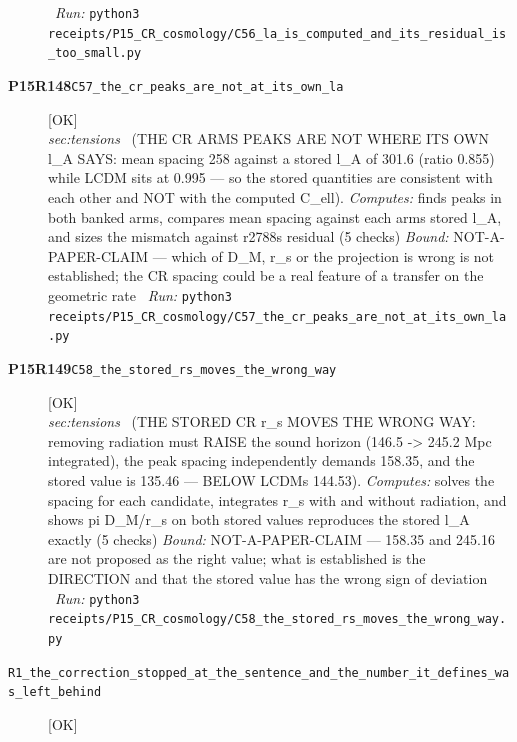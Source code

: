 \begin{description}
\ \emph{Run:} \texttt{python3 receipts/P15\_CR\_cosmology/C56\_la\_is\_computed\_and\_its\_residual\_is\_too\_small.py}
\item[\rcptlabel{C57_the_cr_peaks_are_not_at_its_own_la}{P15R148}\textbf{P15R148}\quad\texttt{C57\_the\_cr\_peaks\_are\_not\_at\_its\_own\_la}]\hfill\textsf{[OK]}\\
\textit{sec:tensions} \ (THE CR ARMS PEAKS ARE NOT WHERE ITS OWN l\_A SAYS: mean spacing 258 against a stored l\_A of 301.6 (ratio 0.855) while LCDM sits at 0.995 --- so the stored quantities are consistent with each other and NOT with the computed C\_ell). 
\emph{Computes:} finds peaks in both banked arms, compares mean spacing against each arms stored l\_A, and sizes the mismatch against r2788s residual (5 checks)
 \emph{Bound:} NOT-A-PAPER-CLAIM --- which of D\_M, r\_s or the projection is wrong is not established; the CR spacing could be a real feature of a transfer on the geometric rate
\ \emph{Run:} \texttt{python3 receipts/P15\_CR\_cosmology/C57\_the\_cr\_peaks\_are\_not\_at\_its\_own\_la.py}
\item[\rcptlabel{C58_the_stored_rs_moves_the_wrong_way}{P15R149}\textbf{P15R149}\quad\texttt{C58\_the\_stored\_rs\_moves\_the\_wrong\_way}]\hfill\textsf{[OK]}\\
\textit{sec:tensions} \ (THE STORED CR r\_s MOVES THE WRONG WAY: removing radiation must RAISE the sound horizon (146.5 -> 245.2 Mpc integrated), the peak spacing independently demands 158.35, and the stored value is 135.46 --- BELOW LCDMs 144.53). 
\emph{Computes:} solves the spacing for each candidate, integrates r\_s with and without radiation, and shows pi D\_M/r\_s on both stored values reproduces the stored l\_A exactly (5 checks)
 \emph{Bound:} NOT-A-PAPER-CLAIM --- 158.35 and 245.16 are not proposed as the right value; what is established is the DIRECTION and that the stored value has the wrong sign of deviation
\ \emph{Run:} \texttt{python3 receipts/P15\_CR\_cosmology/C58\_the\_stored\_rs\_moves\_the\_wrong\_way.py}
\item[\label{rcpt:R1_the_correction_stopped_at_the_sentence_and_the_number_it_defines_was_left_behind}\textbf{}\quad\texttt{R1\_the\_correction\_stopped\_at\_the\_sentence\_and\_the\_number\_it\_defines\_was\_left\_behind}]\hfill\textsf{[OK]}\\

\end{description}
